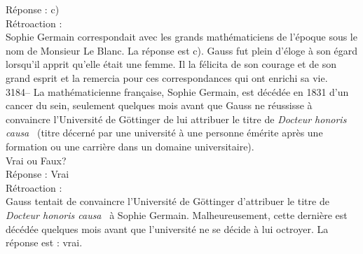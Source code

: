 \documentclass[letterpaper, 12pt]{article}
\begin{document}
R\'eponse : c)\\

R\'etroaction :\\
Sophie Germain correspondait avec les grands math\'ematiciens de l'\'epoque sous le nom de Monsieur Le Blanc. La r\'eponse est c). Gauss fut plein d'\'eloge \`a son \'egard lorsqu'il apprit qu'elle \'etait une femme. Il la f\'elicita de son courage et de son grand esprit et la remercia pour ces correspondances qui ont enrichi sa vie.\\


3184-- La math\'ematicienne fran\c caise, Sophie Germain, est d\'ec\'ed\'ee en 1831 d'un cancer du sein, seulement quelques mois avant que Gauss ne r\'eussisse \`a convaincre l'Universit\'e de G\"ottinger de lui attribuer le titre de \emph{Docteur honoris causa} \ (titre d\'ecern\'e par une universit\'e \`a une personne \'em\'erite apr\`es une formation ou une carri\`ere dans un domaine universitaire).\\
Vrai ou Faux?\\

R\'eponse : Vrai\\

R\'etroaction :\\
Gauss tentait de convaincre l'Universit\'e de G\"ottinger d'attribuer le titre de \emph{Docteur honoris causa} \ \`a Sophie Germain. Malheureusement, cette derni\`ere est d\'ec\'ed\'ee quelques mois avant que l'universit\'e ne se d\'ecide \`a lui octroyer. La r\'eponse est : vrai.\\
\end{document}
